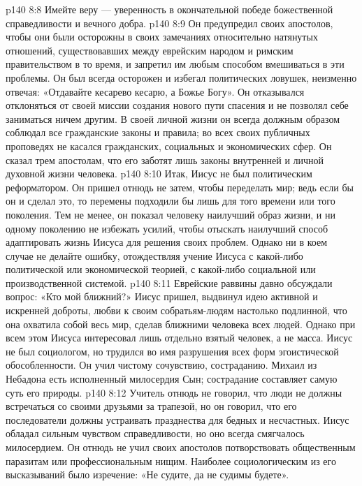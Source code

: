 \vs p140 8:8 Имейте веру --- уверенность в окончательной победе божественной справедливости и вечного добра.
\vs p140 8:9 \pc {}\bibnobreakspace {} Он предупредил своих апостолов, чтобы они были осторожны в своих замечаниях относительно натянутых отношений, существовавших между еврейским народом и римским правительством в то время, и запретил им любым способом вмешиваться в эти проблемы. Он был всегда осторожен и избегал политических ловушек, неизменно отвечая: «Отдавайте кесарево кесарю, а Божье Богу». Он отказывался отклоняться от своей миссии создания нового пути спасения и не позволял себе заниматься ничем другим. В своей личной жизни он всегда должным образом соблюдал все гражданские законы и правила; во всех своих публичных проповедях не касался гражданских, социальных и экономических сфер. Он сказал трем апостолам, что его заботят лишь законы внутренней и личной духовной жизни человека.
\vs p140 8:10 Итак, Иисус не был политическим реформатором. Он пришел отнюдь не затем, чтобы переделать мир; ведь если бы он и сделал это, то перемены подходили бы лишь для того времени или того поколения. Тем не менее, он показал человеку наилучший образ жизни, и ни одному поколению не избежать усилий, чтобы отыскать наилучший способ адаптировать жизнь Иисуса для решения своих проблем. Однако ни в коем случае не делайте ошибку, отождествляя учение Иисуса с какой\hyp{}либо политической или экономической теорией, с какой\hyp{}либо социальной или производственной системой.
\vs p140 8:11 \pc {}\bibnobreakspace {}  Еврейские раввины давно обсуждали вопрос: «Кто мой ближний?» Иисус пришел, выдвинул идею активной и искренней доброты, любви к своим собратьям\hyp{}людям настолько подлинной, что она охватила собой весь мир, сделав ближними человека всех людей. Однако при всем этом Иисуса интересовал лишь отдельно взятый человек, а не масса. Иисус не был социологом, но трудился во имя разрушения всех форм эгоистической обособленности. Он учил чистому сочувствию, состраданию. Михаил из Небадона есть исполненный милосердия Сын; сострадание составляет самую суть его природы.
\vs p140 8:12 Учитель отнюдь не говорил, что люди не должны встречаться со своими друзьями за трапезой, но он говорил, что его последователи должны устраивать празднества для бедных и несчастных. Иисус обладал сильным чувством справедливости, но оно всегда смягчалось милосердием. Он отнюдь не учил своих апостолов потворствовать общественным паразитам или профессиональным нищим. Наиболее социологическим из его высказываний было изречение: «Не судите, да не судимы будете».
